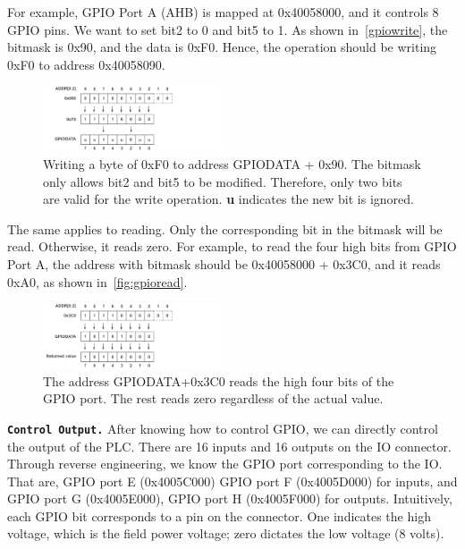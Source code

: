 For example, GPIO Port A (AHB) is mapped at 0x40058000, and it controls 8 GPIO pins. We want to set bit2 to 0 and bit5 to 1. As shown in~\autoref{gpiowrite}, the bitmask is 0x90, and the data is 0xF0.  Hence, the operation should be writing 0xF0 to address 0x40058090.


\begin{figure}[th]
	\includegraphics[width=0.47\textwidth]{figures/gpiowrite2}
	\centering
	\caption{Writing a byte of 0xF0 to address GPIODATA + 0x90.  The bitmask only allows bit2 and bit5 to be modified. Therefore, only two bits are valid for the write operation.  \textbf{u} indicates the new bit is ignored.}
	\label{fig:gpiowrite}
\end{figure}



The same applies to reading. Only the corresponding bit in the bitmask will be read. Otherwise, it reads zero. For example, to read the four high bits from GPIO Port A, the address with bitmask should be 0x40058000 + 0x3C0, and it reads 0xA0, as shown in~\autoref{fig:gpioread}.

\begin{figure}[th]
	\includegraphics[width=0.47\textwidth]{figures/gpioread2}
	\centering
	\caption{The address GPIODATA+0x3C0 reads the high four bits of the GPIO port. The rest reads zero regardless of the actual value.}
	\label{fig:gpioread}
\end{figure}



\textbf{\texttt{Control Output.}} After knowing how to control GPIO, we can directly control the output of the PLC. There are 16 inputs and 16 outputs on the IO connector. Through reverse engineering, we know the GPIO port corresponding to the IO.  That are, GPIO port E (0x4005C000) GPIO port F (0x4005D000) for inputs, and GPIO port G (0x4005E000), GPIO port H (0x4005F000) for outputs. Intuitively, each GPIO bit corresponds to a pin on the connector. One indicates the high voltage, which is the field power voltage; zero dictates the low voltage (8 volts).

